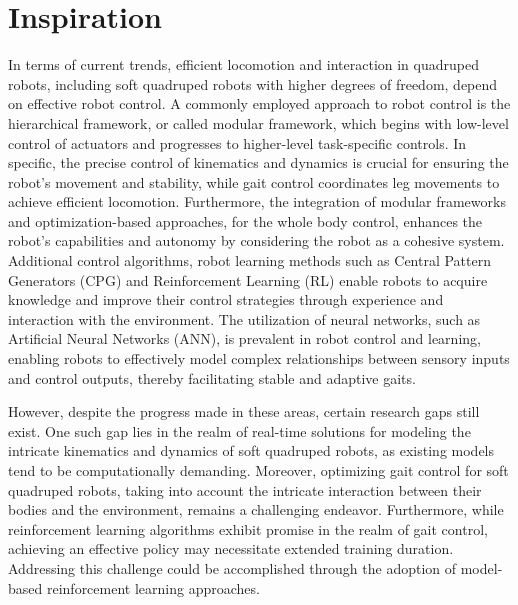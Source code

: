 \section{Inspiration}
In terms of current trends, efficient locomotion and interaction in quadruped robots, including soft quadruped robots with higher degrees of freedom, depend on effective robot control. A commonly employed approach to robot control is the hierarchical framework, or called modular framework, which begins with low-level control of actuators and progresses to higher-level task-specific controls. In specific, the precise control of kinematics and dynamics is crucial for ensuring the robot's movement and stability, while gait control coordinates leg movements to achieve efficient locomotion. Furthermore, the integration of modular frameworks and optimization-based approaches, for the whole body control, enhances the robot's capabilities and autonomy by considering the robot as a cohesive system. Additional control algorithms, robot learning methods such as Central Pattern Generators (CPG) and Reinforcement Learning (RL) enable robots to acquire knowledge and improve their control strategies through experience and interaction with the environment. The utilization of neural networks, such as Artificial Neural Networks (ANN), is prevalent in robot control and learning, enabling robots to effectively model complex relationships between sensory inputs and control outputs, thereby facilitating stable and adaptive gaits.

However, despite the progress made in these areas, certain research gaps still exist. One such gap lies in the realm of real-time solutions for modeling the intricate kinematics and dynamics of soft quadruped robots, as existing models tend to be computationally demanding. Moreover, optimizing gait control for soft quadruped robots, taking into account the intricate interaction between their bodies and the environment, remains a challenging endeavor. Furthermore, while reinforcement learning algorithms exhibit promise in the realm of gait control, achieving an effective policy may necessitate extended training duration. Addressing this challenge could be accomplished through the adoption of model-based reinforcement learning approaches.

